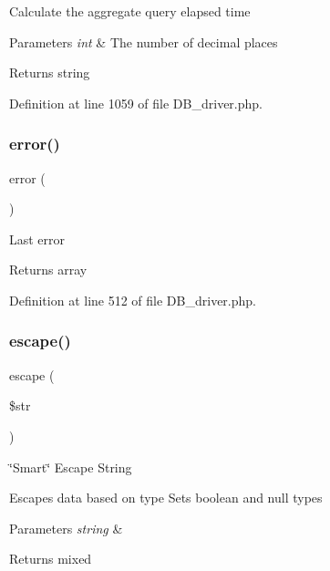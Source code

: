Calculate the aggregate query elapsed time


\begin{DoxyParams}{Parameters}
{\em int} & The number of decimal places \\
\hline
\end{DoxyParams}
\begin{DoxyReturn}{Returns}
string 
\end{DoxyReturn}


Definition at line 1059 of file D\+B\+\_\+driver.\+php.

\mbox{\label{class_c_i___d_b__driver_a43b8d30b879d4f09ceb059b02af2bc02}} 
\subsubsection{\texorpdfstring{error()}{error()}}
{\footnotesize\ttfamily error (\begin{DoxyParamCaption}{ }\end{DoxyParamCaption})}

Last error

\begin{DoxyReturn}{Returns}
array 
\end{DoxyReturn}


Definition at line 512 of file D\+B\+\_\+driver.\+php.

\mbox{\label{class_c_i___d_b__driver_ac8f37ca5703d4558c732e692194f8cd6}} 
\subsubsection{\texorpdfstring{escape()}{escape()}}
{\footnotesize\ttfamily escape (\begin{DoxyParamCaption}\item[{}]{\$str }\end{DoxyParamCaption})}

\char`\"{}\+Smart\char`\"{} Escape String

Escapes data based on type Sets boolean and null types


\begin{DoxyParams}{Parameters}
{\em string} & \\
\hline
\end{DoxyParams}
\begin{DoxyReturn}{Returns}
mixed 
\end{DoxyReturn}


